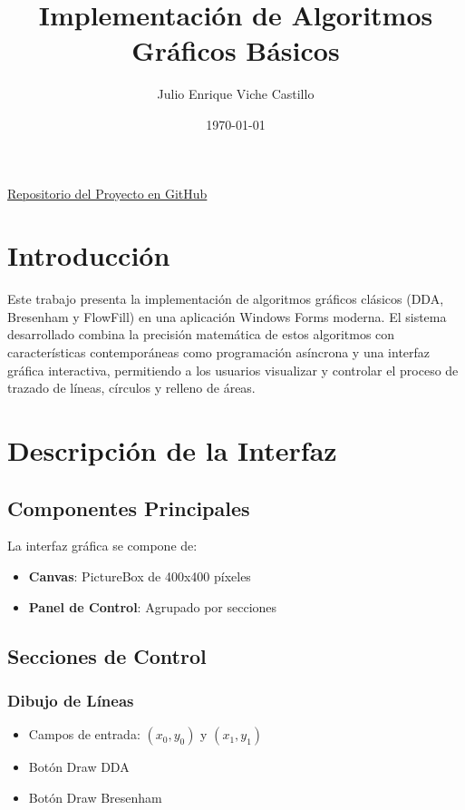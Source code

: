 \documentclass[12pt]{article}
\title{Implementación de Algoritmos Gráficos Básicos}
\author{Julio Enrique Viche Castillo}
\date{\today}
\begin{document}
\maketitle

\begin{center}
\href{https://github.com/JulioViche/GraphicAlgorithms}{Repositorio del Proyecto en GitHub}
\end{center}

\section{Introducción}
Este trabajo presenta la implementación de algoritmos gráficos clásicos (DDA, Bresenham y FlowFill) en una aplicación Windows Forms moderna. El sistema desarrollado combina la precisión matemática de estos algoritmos con características contemporáneas como programación asíncrona y una interfaz gráfica interactiva, permitiendo a los usuarios visualizar y controlar el proceso de trazado de líneas, círculos y relleno de áreas.

\section{Descripción de la Interfaz}

\subsection{Componentes Principales}
La interfaz gráfica se compone de:

\begin{itemize}
    \item \textbf{Canvas}: PictureBox de 400x400 píxeles
    \item \textbf{Panel de Control}: Agrupado por secciones
\end{itemize}

\subsection{Secciones de Control}

\subsubsection{Dibujo de Líneas}
\begin{itemize}
    \item Campos de entrada: $(x_0,y_0)$ y $(x_1,y_1)$
    \item Botón Draw DDA
    \item Botón Draw Bresenham
\end{itemize}
\end{document}
